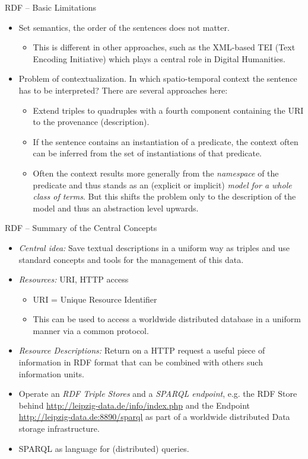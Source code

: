 \documentclass{beamer}
\begin{document}
\begin{frame}{RDF -- Basic Limitations}
\begin{itemize}
\item Set semantics, the order of the sentences does not matter.
  \begin{itemize}
  \item This is different in other approaches, such as the XML-based TEI (Text
    Encoding Initiative) which plays a central role in Digital Humanities.
  \end{itemize}
\item Problem of contextualization. In which spatio-temporal context the
  sentence has to be interpreted? There are several approaches here:
  \begin{itemize}
  \item Extend triples to quadruples with a fourth component containing the
    URI to the provenance (description).
  \item If the sentence contains an instantiation of a predicate, the context
    often can be inferred from the set of instantiations of that predicate.
  \item Often the context results more generally from the \emph{namespace} of
    the predicate and thus stands as an (explicit or implicit) \emph{model for
      a whole class of terms}.  But this shifts the problem only to the
    description of the model and thus an abstraction level upwards.
  \end{itemize}
\end{itemize}
\end{frame}
\begin{frame}{RDF -- Summary of the Central Concepts}
\begin{itemize}
\item \emph{Central idea:} Save textual descriptions in a uniform way as
  triples and use standard concepts and tools for the management of this data.
\item \emph{Resources:} URI, HTTP access
  \begin{itemize}
  \item URI = Unique Resource Identifier
  \item This can be used to access a worldwide distributed database in a
    uniform manner via a common protocol.
  \end{itemize}
\item \emph{Resource Descriptions:} Return on a HTTP request a useful piece of
  information in RDF format that can be combined with others such information
  units.
\item Operate an \emph{RDF Triple Stores} and a \emph{SPARQL endpoint}, e.g.
  the RDF Store behind \url{http://leipzig-data.de/info/index.php} and the
  Endpoint \url{http://leipzig-data.de:8890/sparql} as part of a worldwide
  distributed Data storage infrastructure.
\item SPARQL as language for (distributed) queries.
\end{itemize}
\end{frame}
\end{document}

